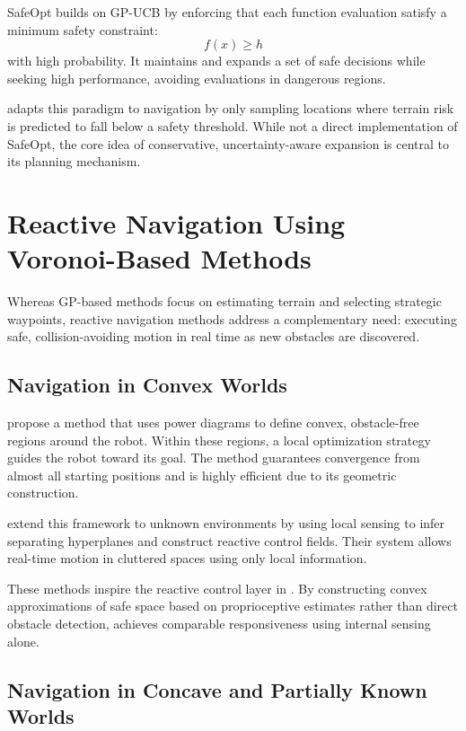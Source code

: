 SafeOpt builds on GP-UCB by enforcing that each function evaluation satisfy a minimum safety constraint:
\[
f(x) \geq h
\]
with high probability. It maintains and expands a set of safe decisions while seeking high performance, avoiding evaluations in dangerous regions.

\algoname{} adapts this paradigm to navigation by only sampling locations where terrain risk is predicted to fall below a safety threshold. While not a direct implementation of SafeOpt, the core idea of conservative, uncertainty-aware expansion is central to its planning mechanism.

\section{Reactive Navigation Using Voronoi-Based Methods}

Whereas GP-based methods focus on estimating terrain and selecting strategic waypoints, reactive navigation methods address a complementary need: executing safe, collision-avoiding motion in real time as new obstacles are discovered.

\subsection{Navigation in Convex Worlds}

\textcite{arslan2016exactrobotnavigation} propose a method that uses power diagrams to define convex, obstacle-free regions around the robot. Within these regions, a local optimization strategy guides the robot toward its goal. The method guarantees convergence from almost all starting positions and is highly efficient due to its geometric construction.

\textcite{arslan2016sensorbasedreactive} extend this framework to unknown environments by using local sensing to infer separating hyperplanes and construct reactive control fields. Their system allows real-time motion in cluttered spaces using only local information.

These methods inspire the reactive control layer in \algoname. By constructing convex approximations of safe space based on proprioceptive estimates rather than direct obstacle detection, \algoname{} achieves comparable responsiveness using internal sensing alone.

\subsection{Navigation in Concave and Partially Known Worlds}

